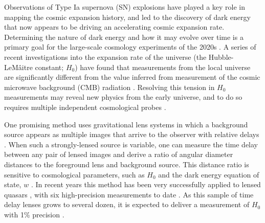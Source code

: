 \documentclass[12pt,dvipsnames]{article}
\begin{document}




Observations of Type Ia supernova (SN) explosions have played a key role in mapping the cosmic expansion history, and led to the discovery of dark energy that now appears to be driving an accelerating cosmic expansion rate\cite{riess_observational_1998,perlmutter_measurements_1999, Riess_large_2019}.  Determining the nature of dark energy and how it may evolve over time is a primary goal for the large-scale cosmology experiments of the 2020s \cite{amendola_cosmology_2013,spergel_wide_2015,Ivezic_lsst_2019}.
A series of recent investigations into the expansion rate of the universe (the Hubble-LeM\^aitre constant; $H_0$) have found that measurements from the local universe are significantly different from the value inferred from measurement of the cosmic microwave background (CMB) radiation \cite{Riess_large_2019,aghanim_planck_2018}.  Resolving this tension in $H_0$ measurements may reveal new physics from the early universe, and to do so requires multiple 
independent cosmological probes \cite{verde_tensions_2019}.

One promising method uses %
gravitational lens systems in which a background
source appears as multiple images that arrive to the observer with relative delays \cite{einstein_lens_1936}.
When such a strongly-lensed source is variable, one can measure the time delay between any pair of lensed images and derive a ratio of angular diameter distances to the foreground lens and background source. 
This distance ratio is sensitive to cosmological parameters, such as 
$H_0$  and the dark energy equation of state, $w$ \cite{refsdal_possibility_1964,coe_cosmological_2009,linder_lensing_2011}.
In recent years this method has been very successfully applied to lensed
quasars \cite{suyu_cosmology_2014,bonvin_cosmograil_2019}, with six high-precision measurements to date \cite{wong_h0licow_2019}. As this sample of time delay lenses grows to several dozen, it is expected to deliver a measurement of $H_0$ with 1\% precision \cite{suyu_cosological_2018}.  
\end{document}

